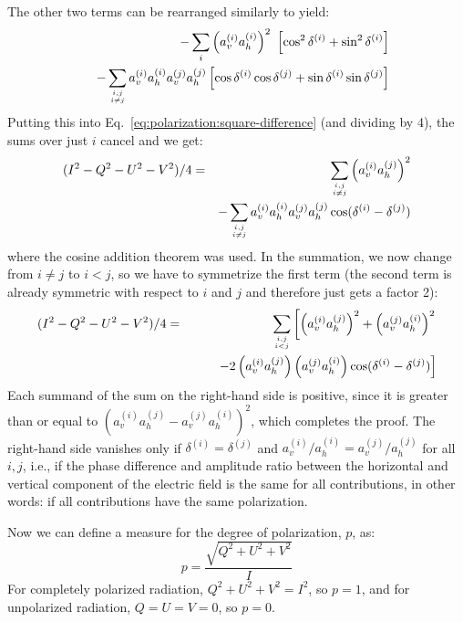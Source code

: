 The other two terms can be rearranged similarly to yield:
\begin{eqnarray}
 &&- \sum_i \left( a_v^{(i)} a_h^{(i)} \right)^2 \
           \left[\cos^2\delta^{(i)} + \sin^2\delta^{(i)} \right]\\ \nonumber
 &&- \sum_{{i,j}\atop{i\not=j}} a_v^{(i)} a_h^{(i)} a_v^{(j)} a_h^{(j)} 
    \left[\cos\delta^{(i)}\cos\delta^{(j)}  
          + \sin\delta^{(i)}\sin\delta^{(j)} \right] 
\end{eqnarray}
Putting this into Eq.~\ref{eq:polarization:square-difference} (and
dividing by 4), the sums over just $i$ cancel and we get:
\begin{eqnarray}
\label{eq:polarization:square-difference2}  
(I^2 - Q^2 - U^2 - V^2)/4 &=&
  \sum_{{i,j}\atop{i\not=j}} \left(a_v^{(i)}a_h^{(j)}\right)^2\\ \nonumber
 &&- \sum_{{i,j}\atop{i\not=j}} a_v^{(i)} a_h^{(i)} a_v^{(j)} a_h^{(j)} 
    \cos(\delta^{(i)}-\delta^{(j)}) 
\end{eqnarray}
where the cosine addition theorem was used.  In the summation, we now
change from $i \not= j$ to $i<j$, so we have to symmetrize the first
term (the second term is already symmetric with respect to $i$ and $j$ and
therefore just gets a factor 2):
\begin{eqnarray}
\label{eq:polarization:square-difference3}  
(I^2 - Q^2 - U^2 - V^2)/4 &=&
  \sum_{{i,j}\atop{i<j}}\left[ 
   \left(a_v^{(i)}a_h^{(j)}\right)^2
   +\left(a_v^{(j)}a_h^{(i)}\right)^2 \right. \\ \nonumber
 &&\qquad\left.
 - 2 \left(a_v^{(i)} a_h^{(j)} \right) \left(a_v^{(j)} a_h^{(i)}\right) 
    \cos(\delta^{(i)}-\delta^{(j)}) \right]
\end{eqnarray}
Each summand of the sum on the right-hand side is positive, since it
is greater than or equal to $(a_v^{(i)}a_h^{(j)} -
a_v^{(j)}a_h^{(i)})^2$, which completes the proof.
The right-hand side vanishes only if $\delta^{(i)}=\delta^{(j)}$ and
$a_v^{(i)}/a_h^{(i)} = a_v^{(j)}/a_h^{(j)}$ for all $i,j$, i.e., if
the phase difference and amplitude ratio between the horizontal and
vertical component of the electric field is the same for all
contributions, in other words: if all contributions have the same
polarization.

Now we can define a measure for the degree of polarization, $p$, as:
\begin{equation}
  \label{eq:polarization:pol_degree}
  p = \frac{\sqrt{Q^2 + U^2 + V^2}}{I}
\end{equation}
For completely polarized radiation, $Q^2 + U^2 + V^2 = I^2$, so $p =
1$, and for unpolarized radiation, $Q = U = V = 0$, so $p = 0$.

